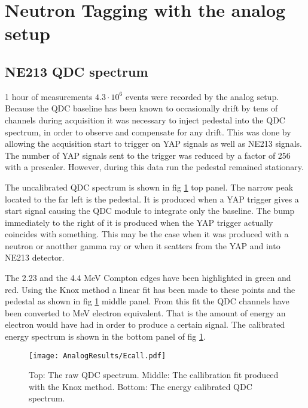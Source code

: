 \documentclass[main.tex]{subfiles}
\begin{document}
\section{Neutron Tagging with the analog setup}
\subsection{NE213 QDC spectrum}
1 hour of measurements $4.3\cdot 10^{6}$ events were recorded by the analog setup. Because the QDC baseline has been known to occasionally drift by tens of channels during acquisition it was necessary to inject pedestal into the QDC spectrum, in order to observe and compensate for any drift. This was done by allowing the acquisition start to trigger on YAP signals as well as NE213 signals. The number of YAP signals sent to the trigger was reduced by a factor of 256 with a prescaler. However, during this data run the pedestal remained stationary.

The uncalibrated QDC spectrum is shown in fig \ref{fig:qdc_a} top panel. The narrow peak located to the far left is the pedestal. It is produced when a YAP trigger gives a start signal causing the QDC module to integrate only the baseline. The bump immediately to the right of it is produced when the YAP trigger actually coincides with something. This may be the case when it was produced with a neutron or anotther gamma ray or when it scatters from the YAP and into NE213 detector.

The 2.23 and the 4.4 MeV Compton edges have been highlighted in green and red. Using the Knox method a linear fit has been made to these points and the pedestal as shown in fig \ref{fig:qdc_a} middle panel. From this fit the QDC channels have been converted to MeV electron equivalent. That is the amount of energy an electron would have had in order to produce a certain signal. The calibrated energy spectrum is shown in the bottom panel of fig \ref{fig:qdc_a}.
\begin{figure}[ht!]
    \centering
        \texttt{[image: AnalogResults/Ecall.pdf]}
        \caption{Top: The raw QDC spectrum. Middle: The callibration fit produced with the Knox method. Bottom: The energy calibrated QDC spectrum.}
    \label{fig:qdc_a}
\end{figure}
\end{document}
